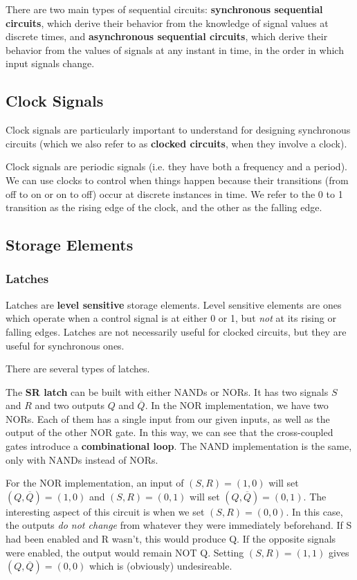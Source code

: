 \documentclass[12pt]{article}
\begin{document}
There are two main types of sequential circuits: {\bf synchronous sequential circuits}, which derive their behavior from the knowledge of signal values at discrete times, and {\bf asynchronous sequential circuits}, which derive their behavior from the values of signals at any instant in time, in the order in which input signals change.

\subsection*{Clock Signals}
Clock signals are particularly important to understand for designing synchronous circuits (which we also refer to as {\bf clocked circuits}, when they involve a clock).

Clock signals are periodic signals (i.e. they have both a frequency and a period). We can use clocks to control when things happen because their transitions (from off to on or on to off) occur at discrete instances in time. We refer to the 0 to 1 transition as the rising edge of the clock, and the other as the falling edge.

\subsection*{Storage Elements}
\subsubsection*{Latches}
Latches are {\bf level sensitive} storage elements. Level sensitive elements are ones which operate when a control signal is at either 0 or 1, but \emph{not} at its rising or falling edges. Latches are not necessarily useful for clocked circuits, but they are useful for synchronous ones.

There are several types of latches.

The {\bf SR latch} can be built with either NANDs or NORs. It has two signals $S$ and $R$ and two outputs $Q$ and $\overline{Q}$. In the NOR implementation, we have two NORs. Each of them has a single input from our given inputs, as well as the output of the other NOR gate. In this way, we can see that the cross-coupled gates introduce a {\bf combinational loop}. The NAND implementation is the same, only with NANDs instead of NORs.

For the NOR implementation, an input of $(S,R) = (1,0)$ will set $(Q,\overline{Q}) = (1,0)$ and  $(S,R) = (0,1)$ will set $(Q,\overline{Q}) = (0,1)$. The interesting aspect of this circuit is when we set $(S,R) = (0,0)$. In this case, the outputs \emph{do not change} from whatever they were immediately beforehand. If S had been enabled and R wasn't, this would produce Q. If the opposite signals were enabled, the output would remain NOT Q. Setting $(S,R) = (1,1)$ gives $(Q,\overline{Q}) = (0,0)$ which is (obviously) undesireable.
\end{document}
